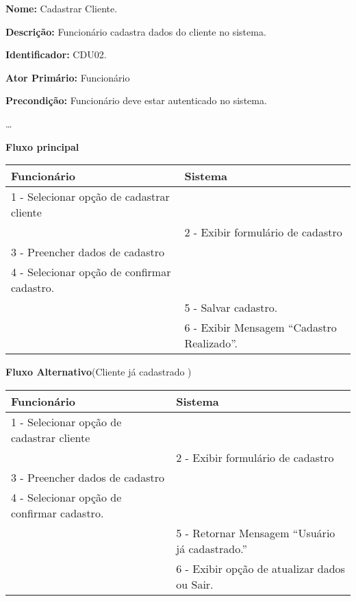 \par
\textbf{Nome:} Cadastrar Cliente.
\par
\textbf{Descrição:} Funcionário cadastra dados do cliente no sistema.
\par 
\textbf{Identificador:} CDU02.
\par
\textbf{Ator Primário:} Funcionário	
\par
\textbf{Precondição:} Funcionário deve estar autenticado no sistema.
\par
\ldots
\par
\textbf{Fluxo principal}\par
\begin{tabular}{|p{7cm}|p{7cm}|}
	\hline 
	Funcionário & Sistema \\ 
	\hline 	
	1 - Selecionar opção de cadastrar cliente &  \\ 
	\hline 
	& 
	
	2 - Exibir formulário de cadastro 
	\\ 
	\hline 
	3 - Preencher dados de cadastro
	& 		
	
	\\ 
	\hline 
	4 - Selecionar opção de confirmar cadastro.
	& 
	
	\\ 
	\hline 
	& 	
	
	5 - Salvar cadastro. 	
	\\ 
	\hline 
	& 
	
	6 - Exibir Mensagem “Cadastro Realizado”.
	\\ 		
	\hline 
\end{tabular} 
\vspace{12px}
\par
\textbf{Fluxo Alternativo}(Cliente já cadastrado )\par
\begin{tabular}{|p{7cm}|p{7cm}|}
	\hline 
	Funcionário & Sistema \\ 
	\hline 	
	1 - Selecionar opção de cadastrar cliente &  \\ 
	\hline 
	& 
	
	2 - Exibir formulário de cadastro 
	\\ 
	\hline 
	3 - Preencher dados de cadastro
	& 		
	
	\\ 
	\hline 
	4 - Selecionar opção de confirmar cadastro.
	& 
	
	\\ 
	\hline 
	& 	
	
	5 - Retornar Mensagem “Usuário já cadastrado.”	
	\\ 
	\hline 
	& 
	
	6 - Exibir opção de atualizar dados  ou Sair.
	\\ 		
	\hline 
\end{tabular}
\vspace{12px}

